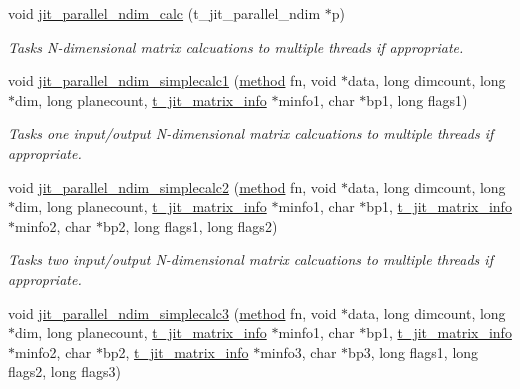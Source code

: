 \begin{DoxyCompactItemize}
\item 
void \hyperlink{group__parallelutilmod_gad3af91109732554c8d7bbdb5b575bdc3}{jit\_\-parallel\_\-ndim\_\-calc} (t\_\-jit\_\-parallel\_\-ndim $\ast$p)
\begin{DoxyCompactList}\small\item\em Tasks N-\/dimensional matrix calcuations to multiple threads if appropriate. \item\end{DoxyCompactList}\item 
void \hyperlink{group__parallelutilmod_ga86f0d53ddcde42a844507338fedd829e}{jit\_\-parallel\_\-ndim\_\-simplecalc1} (\hyperlink{group__datatypes_gac26ba0a173b50597f5738132e059b42d}{method} fn, void $\ast$data, long dimcount, long $\ast$dim, long planecount, \hyperlink{structt__jit__matrix__info}{t\_\-jit\_\-matrix\_\-info} $\ast$minfo1, char $\ast$bp1, long flags1)
\begin{DoxyCompactList}\small\item\em Tasks one input/output N-\/dimensional matrix calcuations to multiple threads if appropriate. \item\end{DoxyCompactList}\item 
void \hyperlink{group__parallelutilmod_gaeb6c9b472d61bdda9fd33aa61a36df1f}{jit\_\-parallel\_\-ndim\_\-simplecalc2} (\hyperlink{group__datatypes_gac26ba0a173b50597f5738132e059b42d}{method} fn, void $\ast$data, long dimcount, long $\ast$dim, long planecount, \hyperlink{structt__jit__matrix__info}{t\_\-jit\_\-matrix\_\-info} $\ast$minfo1, char $\ast$bp1, \hyperlink{structt__jit__matrix__info}{t\_\-jit\_\-matrix\_\-info} $\ast$minfo2, char $\ast$bp2, long flags1, long flags2)
\begin{DoxyCompactList}\small\item\em Tasks two input/output N-\/dimensional matrix calcuations to multiple threads if appropriate. \item\end{DoxyCompactList}\item 
void \hyperlink{group__parallelutilmod_ga56ab668e990aecaa80cd0d37b8123c36}{jit\_\-parallel\_\-ndim\_\-simplecalc3} (\hyperlink{group__datatypes_gac26ba0a173b50597f5738132e059b42d}{method} fn, void $\ast$data, long dimcount, long $\ast$dim, long planecount, \hyperlink{structt__jit__matrix__info}{t\_\-jit\_\-matrix\_\-info} $\ast$minfo1, char $\ast$bp1, \hyperlink{structt__jit__matrix__info}{t\_\-jit\_\-matrix\_\-info} $\ast$minfo2, char $\ast$bp2, \hyperlink{structt__jit__matrix__info}{t\_\-jit\_\-matrix\_\-info} $\ast$minfo3, char $\ast$bp3, long flags1, long flags2, long flags3)

\end{DoxyCompactItemize}
